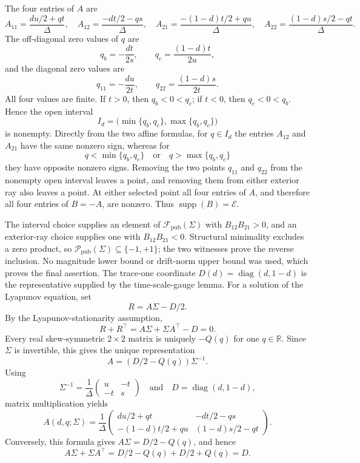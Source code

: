The four entries of \(A\) are
\[
A_{11}=\frac{du/2+qt}{\Delta},\quad
A_{12}=\frac{-dt/2-qs}{\Delta},\quad
A_{21}=\frac{-(1-d)t/2+qu}{\Delta},\quad
A_{22}=\frac{(1-d)s/2-qt}{\Delta}.
\]
The off-diagonal zero values of \(q\) are
\[
q_b=-\frac{dt}{2s},
\qquad
q_c=\frac{(1-d)t}{2u},
\]
and the diagonal zero values are
\[
q_{11}=-\frac{du}{2t},
\qquad
q_{22}=\frac{(1-d)s}{2t}.
\]
All four values are finite. If \(t>0\), then \(q_b<0<q_c\); if \(t<0\), then \(q_c<0<q_b\). Hence the open interval
\[
I_d=\bigl(\min\{q_b,q_c\},\max\{q_b,q_c\}\bigr)
\]
is nonempty. Directly from the two affine formulas, for \(q\in I_d\) the entries \(A_{12}\) and \(A_{21}\) have the same nonzero sign, whereas for
\[
q<\min\{q_b,q_c\}
\quad\text{or}\quad
q>\max\{q_b,q_c\}
\]
they have opposite nonzero signs. Removing the two points \(q_{11}\) and \(q_{22}\) from the nonempty open interval leaves a point, and removing them from either exterior ray also leaves a point. At either selected point all four entries of \(A\), and therefore all four entries of \(B=-A\), are nonzero. Thus \(\operatorname{supp}(B)=\mathcal E\).

The interval choice supplies an element of \(\mathcal F_{\mathrm{pub}}(\Sigma)\) with \(B_{12}B_{21}>0\), and an exterior-ray choice supplies one with \(B_{12}B_{21}<0\). Structural minimality excludes a zero product, so \(\mathcal P_{\mathrm{pub}}(\Sigma)\subseteq\{-1,+1\}\); the two witnesses prove the reverse inclusion. No magnitude lower bound or drift-norm upper bound was used, which proves the final assertion.
The trace-one coordinate \(D(d)=\operatorname{diag}(d,1-d)\) is the representative supplied by the time-scale-gauge lemma. For a solution of the Lyapunov equation, set
\[
R=A\Sigma-D/2.
\]
By the Lyapunov-stationarity assumption,
\[
R+R^{\top}=A\Sigma+\Sigma A^{\top}-D=0.
\]
Every real skew-symmetric \(2\times2\) matrix is uniquely \(-Q(q)\) for one \(q\in\mathbb R\). Since \(\Sigma\) is invertible, this gives the unique representation
\[
A=(D/2-Q(q))\Sigma^{-1}.
\]
Using
\[
\Sigma^{-1}=\frac1\Delta\begin{pmatrix}u&-t\\-t&s\end{pmatrix}
\quad\text{and}\quad
D=\operatorname{diag}(d,1-d),
\]
matrix multiplication yields
\[
A(d,q;\Sigma)=\frac1\Delta
\begin{pmatrix}
du/2+qt&-dt/2-qs\\
-(1-d)t/2+qu&(1-d)s/2-qt
\end{pmatrix}.
\]
Conversely, this formula gives \(A\Sigma=D/2-Q(q)\), and hence
\[
A\Sigma+\Sigma A^{\top}=D/2-Q(q)+D/2+Q(q)=D.
\]

